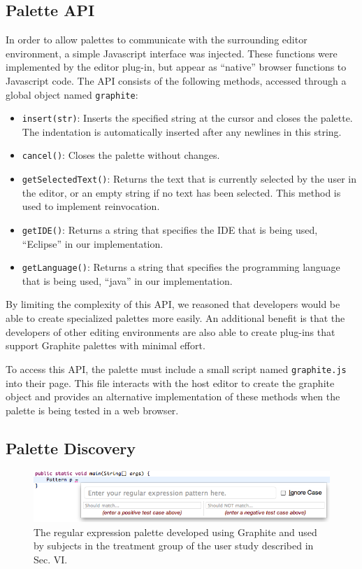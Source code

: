 \documentclass[10pt, conference, compsocconf]{IEEEtran}
\begin{document}
\subsection{Palette API}
In order to allow palettes to communicate with the surrounding editor environment, a simple Javascript interface was injected. These functions were implemented by the editor plug-in, but appear as ``native'' browser functions to Javascript code. The API consists of the following methods, accessed through a global object named \verb|graphite|:
\begin{itemize}
	\item \verb|insert(str)|: Inserts the specified string at the cursor and closes the palette. The indentation is automatically inserted after any newlines in this string.
	
	\item \verb|cancel()|: Closes the palette without changes.
	
	\item \verb|getSelectedText()|: Returns the text that is currently selected by the user in the editor, or an empty string if no text has been selected. This method is used to implement reinvocation.
	
	\item \verb|getIDE()|: Returns a string that specifies the IDE that is being used, ``Eclipse'' in our implementation.
	
	\item \verb|getLanguage()|: Returns a string that specifies the programming language that is being used, ``java'' in our implementation.
\end{itemize}

By limiting the complexity of this API, we reasoned that developers would be able to create specialized palettes more easily. An additional benefit is that the developers of other editing environments are also able to create plug-ins that support Graphite palettes with minimal effort.

To access this API, the palette must include a small script named \verb|graphite.js| into their page. This file interacts with the host editor to create the graphite object and provides an alternative implementation of these methods when the palette is being tested in a web browser.

\subsection{Palette Discovery}
\begin{figure}\begin{center}
\includegraphics[scale=.6]{regex.png}\end{center}
\caption{The regular expression palette developed using Graphite and used by subjects in the treatment group of the user study described in Sec. VI.}
\end{figure}
\end{document}

